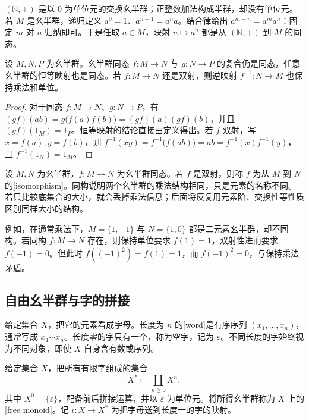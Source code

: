 \ProseParagraphBreak
\((\mathbb N,+)\) 是以 \(0\) 为单位元的交换幺半群；正整数加法构成半群，却没有单位元。若 \(M\) 是幺半群，递归定义 \(a^0=1\)、\(a^{n+1}=a^na\)。结合律给出 \(a^{m+n}=a^ma^n\)：固定 \(m\) 对 \(n\) 归纳即可。于是任取 \(a\in M\)，映射 \(n\mapsto a^n\) 都是从 \((\mathbb N,+)\) 到 \(M\) 的同态。

\begin{proposition}\label{b1:prop:monoid-maps}
	设 \(M,N,P\) 为幺半群。幺半群同态 \(f:M\rightarrow N\) 与 \(g:N\rightarrow P\) 的复合仍是同态，任意幺半群的恒等映射也是同态。若 \(f:M\rightarrow N\) 还是双射，则逆映射 \(f^{-1}:N\rightarrow M\) 也保持乘法和单位。
\end{proposition}

\begin{proof}
	对于同态 \(f:M\rightarrow N\)、\(g:N\rightarrow P\)，有 \((gf)(ab)=g\bigl(f(a)f(b)\bigr)=(gf)(a)(gf)(b)\)，并且 \((gf)(1_M)=1_P\)。恒等映射的结论直接由定义得出。若 \(f\) 双射，写 \(x=f(a),y=f(b)\)，则 \(f^{-1}(xy)=f^{-1}\bigl(f(ab)\bigr)=ab=f^{-1}(x)f^{-1}(y)\)，且 \(f^{-1}(1_N)=1_M\)。
\end{proof}

设 \(M,N\) 为幺半群，\(f:M\rightarrow N\) 为幺半群同态。若 \(f\) 是双射，则称 \(f\) 为从 \(M\) 到 \(N\) 的[isomorphism]。同构说明两个幺半群的乘法结构相同，只是元素的名称不同。若只比较底集合的大小，就会丢掉乘法信息；后面将反复用元素阶、交换性等性质区别同样大小的结构。

例如，在通常乘法下，\(M=\{1,-1\}\) 与 \(N=\{1,0\}\) 都是二元素幺半群，却不同构。若同构 \(f:M\rightarrow N\) 存在，则保持单位要求 \(f(1)=1\)，双射性进而要求 \(f(-1)=0\)。但此时 \(f((-1)^2)=f(1)=1\)，而 \(f(-1)^2=0\)，与保持乘法矛盾。

\subsection{自由幺半群与字的拼接}
\label{b1:subsec:0102:02}

给定集合 \(X\)，把它的元素看成字母。长度为 \(n\) 的[word]是有序序列 \((x_1,\ldots,x_n)\)，通常写成 \(x_1\cdots x_n\)。长度零的字只有一个，称为空字，记为 \(\varepsilon\)。不同长度的字始终视为不同对象，即使 \(X\) 自身含有数或序列。

\begin{definition}\label{b1:def:free-monoid}
	给定集合 \(X\)，把所有有限字组成的集合
	\[
		X^*\coloneqq\coprod_{n\geq0}X^n,
	\]
	其中 \(X^0=\{\varepsilon\}\)，配备前后拼接运算，并以 \(\varepsilon\) 为单位元。将所得幺半群称为 \(X\) 上的[free monoid]。记 \(\iota:X\rightarrow X^*\) 为把字母送到长度一的字的映射。
\end{definition}

